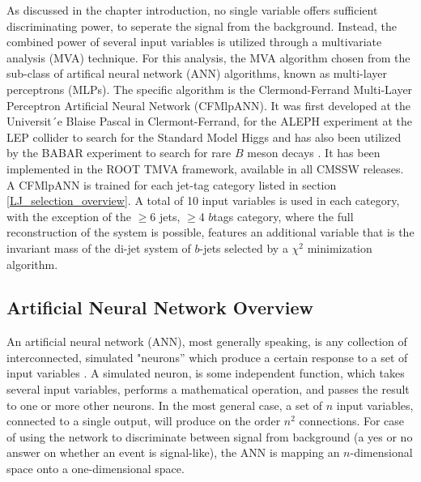 \par As discussed in the chapter introduction, no single variable
offers sufficient discriminating power, to seperate the \ttH signal
from the \ttjets background.  Instead, the combined power of several
input variables is utilized through a multivariate analysis (MVA)
technique.  For this analysis, the MVA algorithm chosen from the sub-class
of artifical neural network (ANN) algorithms, known as multi-layer
perceptrons (MLPs).  The specific algorithm is the Clermond-Ferrand
Multi-Layer Perceptron Artificial Neural Network (CFMlpANN).  It was
first developed at the Universit´e Blaise Pascal in Clermont-Ferrand,
for the ALEPH experiment at the LEP collider to search for the
Standard Model Higgs and has also been utilized by the BABAR
experiment to search for rare $B$ meson decays \cite{Hocker:2007ht}.
It has been implemented in the ROOT TMVA framework, available in all
CMSSW releases.  A CFMlpANN is trained for each jet-tag category
listed in section \ref{LJ_selection_overview}.  A total of 10 input
variables is used in each category, with the exception of the $\ge$6
jets, $\ge$4 $b$tags category, where the full reconstruction of the
\ttH system is possible, features an additional variable that is the
invariant mass of the di-jet system of $b$-jets selected by a
$\chi^{2}$ minimization algorithm.  

\subsection{Artificial Neural Network Overview}
\label{ann_overview}

\par An artificial neural network (ANN), most generally speaking, is
any collection of interconnected, simulated "neurons'' which produce a
certain response to a set of input variables \cite{Hocker:2007ht}.  A
simulated neuron, is some independent function, which takes several
input variables, performs a mathematical operation, and passes the
result to one or more other neurons.  In the most general case, a set
of $n$ input variables, connected to a single output, will produce on
the order $n^{2}$ connections.  For case of using the network to
discriminate between signal from background (a yes or no answer on
whether an event is signal-like), the ANN is mapping an
$n$-dimensional space onto a one-dimensional space.  

